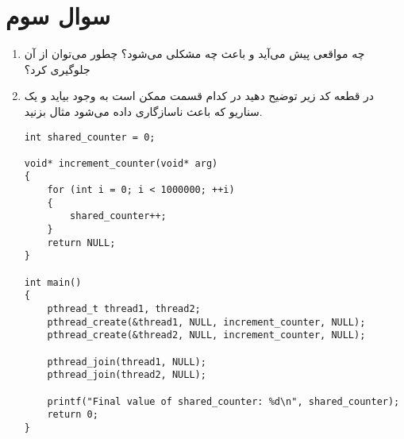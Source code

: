 

\section{سوال سوم}

\begin{enumerate}
	\item 
	  چه مواقعی پیش می‌آید و باعث چه مشکلی می‌شود؟ چطور می‌توان از آن جلوگیری کرد؟

	\begin{qsolve}
		
	\end{qsolve}
	
	
	
	
	\item 
	در قطعه کد زیر توضیح دهید  در کدام قسمت ممکن است به وجود بیاید و یک سناریو که باعث ناسازگاری داده می‌شود مثال بزنید.
	
\begin{latin}
\begin{lstlisting}[caption=Code of Q2, label=cpp_code_example]
int shared_counter = 0;

void* increment_counter(void* arg) 
{
	for (int i = 0; i < 1000000; ++i) 
	{
		shared_counter++;
	}
	return NULL;
}

int main() 
{
	pthread_t thread1, thread2;
	pthread_create(&thread1, NULL, increment_counter, NULL);
	pthread_create(&thread2, NULL, increment_counter, NULL);
	
	pthread_join(thread1, NULL);
	pthread_join(thread2, NULL);
	
	printf("Final value of shared_counter: %d\n", shared_counter);
	return 0;
}
\end{lstlisting}
\end{latin}
	
	
	
	
	
	\begin{qsolve}
		
	\end{qsolve}

\end{enumerate}